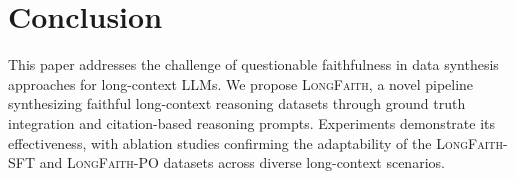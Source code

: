 \section{Conclusion}
\label{sec:conclusion}

This paper addresses the challenge of questionable faithfulness in data synthesis approaches for long-context LLMs.
We propose \textsc{LongFaith}, a novel pipeline synthesizing faithful long-context reasoning datasets through ground truth integration and citation-based reasoning prompts.
Experiments demonstrate its effectiveness, with ablation studies confirming the adaptability of the \textsc{LongFaith}-SFT and \textsc{LongFaith}-PO datasets across diverse long-context scenarios.
